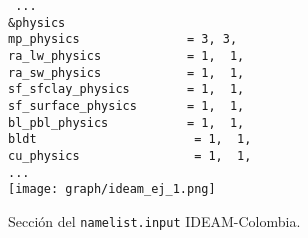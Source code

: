 \begin{itemize}
\begin{figure}[H]

\center
\texttt{
...\\
\&physics\\
mp\_physics~~~~~~~~~~~~~~~=~3,~3,\\
ra\_lw\_physics~~~~~~~~~~~~=~1,~~1,\\
ra\_sw\_physics~~~~~~~~~~~~=~1,~~1,\\
sf\_sfclay\_physics~~~~~~~~=~1,~~1,\\
sf\_surface\_physics~~~~~~~=~1,~~1,\\
bl\_pbl\_physics~~~~~~~~~~~=~1,~~1,\\
bldt~~~~~~~~~~~~~~~~~~~~~~=~1,~~1,\\
cu\_physics~~~~~~~~~~~~~~~~=~1,~~1,\\
...\\
}
\centering
\texttt{[image: graph/ideam\_ej\_1.png]}
\caption{Sección del \texttt{namelist.input} IDEAM-Colombia.}
\label{imag_tab_ej}

\end{figure}








\begin{figure}[H]



\end{figure}
\end{itemize}

